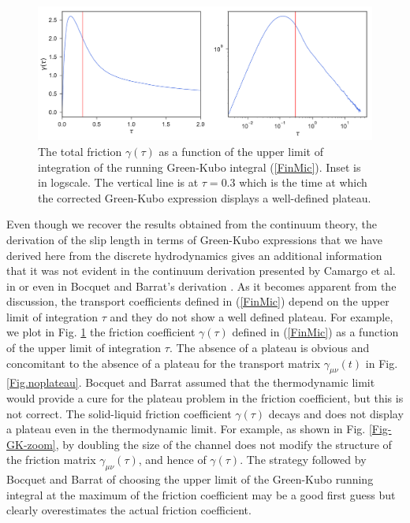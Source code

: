 \documentclass[b5paper,openright,10pt]{book}
\begin{document}
\begin{figure}[]
\includegraphics[width=\linewidth]{etaTotal-17nodes-WALLS}
\caption[The total friction as a funtion of the upper limit of integration of the running Green-Kubo integral for a confined fluid - Thick bins]{The total friction $\gamma(\tau)$ as  a function of the upper
  limit   of   integration   of  the   running   Green-Kubo   integral
  (\ref{FinMic}).  Inset  is in  logscale.  The  vertical line  is  at
  $\tau=0.3$ which is  the time at which the corrected
  Green-Kubo expression displays a well-defined plateau.}
\label{Fig.gammat}
\end{figure}

Even though we  recover the results obtained from the
continuum  theory,  the  derivation  of the  slip
length in  terms of Green-Kubo  expressions that we have  derived here
from the  discrete hydrodynamics gives an  additional information that
it  was not  evident in  the  continuum derivation  presented by Camargo et al. in
\cite{CamargoBC2018}    or   even    in    Bocquet    and   Barrat's    derivation
\cite{Bocquet1994}.  As  it becomes apparent from  the discussion, the
transport coefficients  defined in  (\ref{FinMic}) depend
on the upper limit  of integration $\tau$ and they do  not show a well
defined plateau.  For  example, we plot in  Fig.  \ref{Fig.gammat} the
friction  coefficient $\gamma(\tau)$  defined in  (\ref{FinMic}) as  a
function of  the upper limit of  integration $\tau$. The absence  of a
plateau is obvious  and concomitant to the absence of  a plateau for
the     transport     matrix      $\gamma_{\mu\nu}(t)$     in     Fig.
\ref{Fig.noplateau}.   Bocquet and  Barrat \cite{Bocquet2013}  assumed
that  the thermodynamic  limit would  provide a  cure for  the plateau
problem in  the friction  coefficient, but this  is not  correct.  The
solid-liquid friction  coefficient $\gamma(\tau)$ decays and  does not
display a  plateau even  in the thermodynamic  limit. For  example, as
shown in Fig.   \ref{Fig-GK-zoom}, by doubling the size  of the channel
does   not    modify   the   structure   of    the   friction   matrix
$\gamma_{\mu\nu}(\tau)$, and hence of $\gamma(\tau)$.  The strategy followed
by Bocquet and Barrat of
choosing the  upper limit  of the Green-Kubo  running integral  at the
maximum of  the friction coefficient may  be a
good  first  guess  but  clearly  overestimates  the  actual  friction
coefficient.
\end{document}
